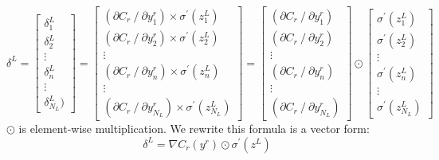 \documentclass{article}
\begin{document}
\[
\delta^L
=
\begin{bmatrix}
\delta^L_1 \\ \delta^L_2 \\ \vdots \\ \delta^L_n \\ \vdots  \\ \delta^L_{N_L})
\end{bmatrix}
=
\begin{bmatrix}
(\partial C_r \mathbin{/} \partial y^r_1)\times\sigma^\prime(z^L_1) \\ 
(\partial C_r \mathbin{/} \partial y^r_2)\times\sigma^\prime(z^L_2) \\
\vdots \\
(\partial C_r \mathbin{/} \partial y^r_n)\times\sigma^\prime(z^L_n) \\
\vdots \\
(\partial C_r \mathbin{/} \partial y^r_{N_L})\times\sigma^\prime(z^L_{N_L})
\end{bmatrix}
=
\begin{bmatrix}
(\partial C_r \mathbin{/} \partial y^r_1) \\ 
(\partial C_r \mathbin{/} \partial y^r_2) \\
\vdots \\
(\partial C_r \mathbin{/} \partial y^r_n) \\
\vdots \\
(\partial C_r \mathbin{/} \partial y^r_{N_L})
\end{bmatrix}
\odot
\begin{bmatrix}
\sigma^\prime(z^L_1) \\ \sigma^\prime(z^L_2) \\ \vdots \\
\sigma^\prime(z^L_n) \\ \vdots \\ \sigma^\prime(z^L_{N_L})
\end{bmatrix}
\]
$\odot$ is element-wise multiplication. We rewrite this formula is a vector form:
\[
\delta^L = \nabla C_r(y^r) \odot \sigma^\prime(z^L)
\]
\end{document}
